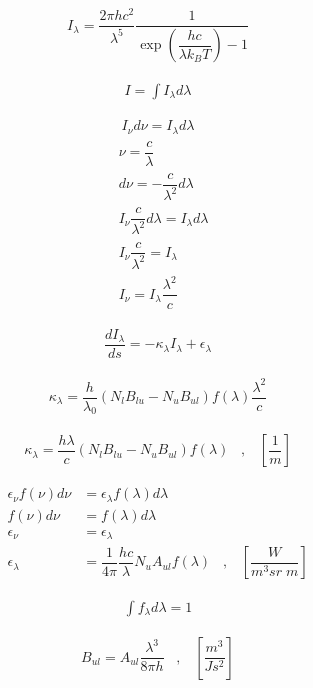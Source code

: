 \begin{align}
I_\lambda = \dfrac{2 \pi h c^2}{\lambda^5} \dfrac{1}{\exp\left(\dfrac{h c}{\lambda k_B T}\right) - 1}
\end{align}

\begin{align}
I = \int I_{\lambda} d\lambda
\end{align}

\begin{align}
I_{\nu} d\nu = I_{\lambda} d\lambda
\end{align}
\begin{align}
&\nu = \dfrac{c}{\lambda} \\
&d\nu = -\dfrac{c}{\lambda^2} d\lambda \\
&I_{\nu} \dfrac{c}{\lambda^2} d\lambda = I_{\lambda} d\lambda \\
&I_{\nu} \dfrac{c}{\lambda^2} = I_{\lambda} \\
&I_{\nu} = I_{\lambda} \dfrac{\lambda^2}{c}
\end{align}


\begin{align}
\dfrac{d I_{\lambda}}{ds} = - \kappa_\lambda I_{\lambda} + 	\epsilon_\lambda
\end{align}

\begin{align}
\kappa_\lambda = \dfrac{h}{\lambda_0} \left(N_l B_{lu} - N_u B_{ul}\right) f(\lambda) \dfrac{\lambda^2}{c}
\end{align}

\begin{align}
\kappa_\lambda = \dfrac{h \lambda}{c} \left(N_l B_{lu} - N_u B_{ul}\right) f(\lambda) 
\;\;\; , \;\;\; \left[\dfrac{1}{m}\right]
\end{align}

\begin{align}
\epsilon_\nu f(\nu) d \nu &= 	\epsilon_\lambda f(\lambda)  d\lambda \\
f(\nu) d \nu &= 	f(\lambda)  d\lambda \\
\epsilon_\nu &= \epsilon_\lambda \\
\epsilon_\lambda &= \dfrac{1}{4 \pi} \dfrac{h c}{\lambda} N_u A_{ul} f(\lambda) 
\;\;\; , \;\;\; \left[\dfrac{W}{m^3 sr \;m}\right]
\end{align}

\begin{align}
\int f_{\lambda} d\lambda = 1
\end{align}

\begin{align}
B_{ul} = A_{ul} \dfrac{\lambda^3}{8 \pi h} \;\;\; , \;\;\; \left[\dfrac{m^3}{J s^2}\right]
\end{align}

